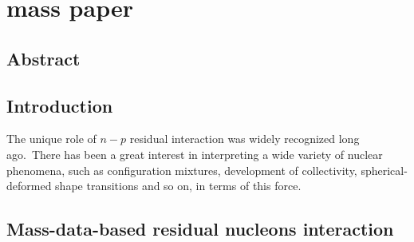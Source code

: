 \chapter{mass paper}
\section{Abstract}
\section{Introduction}
The unique role of $n-p$ residual interaction was widely recognized long ago.~There has been a great interest in interpreting a wide variety of nuclear phenomena, such as configuration mixtures, development of collectivity, spherical-deformed shape transitions and so on, in terms of this force. 
\section{Mass-data-based residual nucleons interaction}